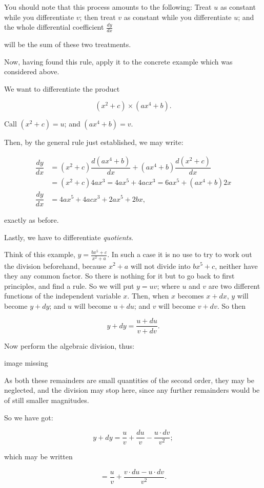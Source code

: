 \documentclass{ximera}
\begin{document}
You should note that this process amounts to the following: Treat $u$ as constant while you differentiate $v$; 
then treat $v$ as constant while you differentiate $u$; and the whole differential coefficient $\frac{dy}{dx}$

will be the sum of these two treatments.

Now, having found this rule, apply it to the concrete example which was considered above.

We want to differentiate the product

$$
(x^2+c)\times (ax^4+b).
$$

Call $(x^2+c)=u$; and $(ax^4+b)=v$.

Then, by the general rule just established, we may write:

\begin{align*}
\dfrac{dy}{dx} &=(x^2+c)\dfrac{d(ax^4+b)}{dx}+(ax^4+b)\dfrac{d(x^2+c)}{dx}\\
 &=(x^2+c)4ax^3=4ax^5+4acx^3=6ax^5+(ax^4+b)2x\\
\dfrac{dy}{dx} &=4ax^5+4acx^3+2ax^5+2bx,
\end{align*}

exactly as before.

Lastly, we have to differentiate \emph{quotients}.

Think of this example, $y=\frac{bx^5+c}{x^2+a}$. In such a case it is no use to try to work out the division 
beforehand, because $x^2+a$ will not divide into $bx^5+c$, neither have they any common factor. So there is 
nothing for it but to go back to first principles, and find a rule. So we will put $y=uv$;
where $u$ and $v$ are two different functions of the independent variable $x$. Then, when $x$ becomes $x+dx$, 
$y$ will become $y+dy$; and $u$ will become $u+du$; and $v$ will become $v+dv$. So then

$$
y+dy=\dfrac{u+du}{v+dv}.
$$

Now perform the algebraic division, thus:


image missing


As both these remainders are small quantities of the second order, they may be neglected, and the division may 
stop here, since any further remainders would be of still smaller magnitudes.

So we have got:

$$
y+dy =\dfrac{u}{v}+\dfrac{du}{v}−\dfrac{u\cdot dv}{v^2};
$$

which may be written

$$
=\dfrac{u}{v}+\dfrac{v\cdot du−u\cdot dv}{v^2}.
$$
\end{document}
